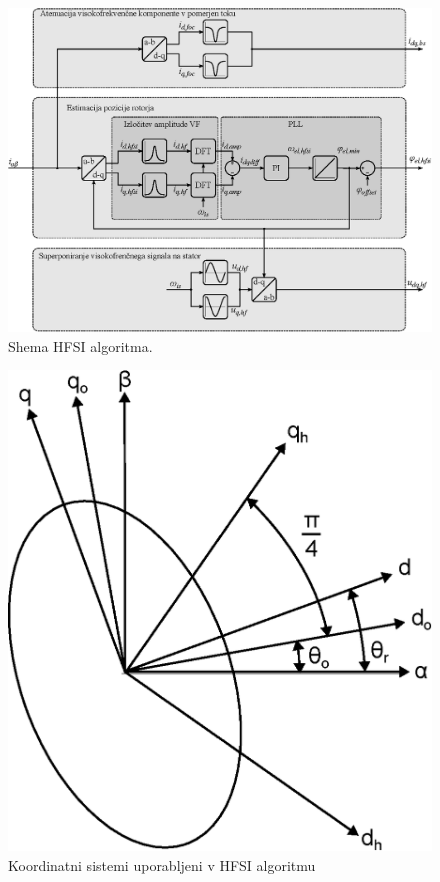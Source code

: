 \documentclass[a4paper,twoside,openright,12pt,slovene]{book}
\begin{document}
\begin{figure}[!htbp]
    \centering
    \includegraphics[width=1\columnwidth]{Slike/Inkscape/HFSI.eps}
    \caption{\label{hfsiMetoda} Shema HFSI algoritma.}
\end{figure}

\begin{figure}[!htbp]
    \centering
    \includegraphics[width=0.75\columnwidth]{Slike/Inkscape/koordinatniSistem.eps}
    \caption{\label{koordinatniSistem} Koordinatni sistemi uporabljeni v HFSI algoritmu}
\end{figure}
\end{document}
